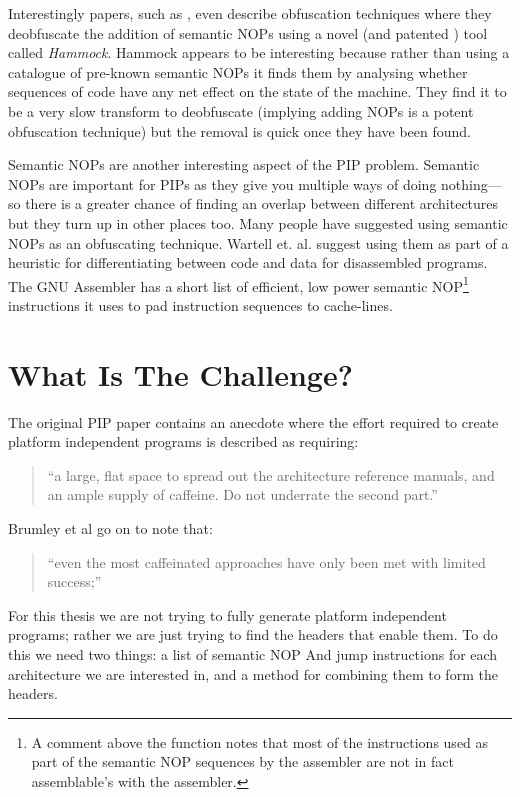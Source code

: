 \documentclass[10pt,]{book}
\begin{document}
Interestingly papers, such as
\autocite{Christodorescu:2005vh}\autocite{Christodorescu:2005vf}, even
describe obfuscation techniques where they deobfuscate the addition of
semantic NOPs using a novel (and patented
\autocite{Christodorescu:2009wo}) tool called \emph{Hammock}. Hammock
appears to be interesting because rather than using a catalogue of
pre-known semantic NOPs it finds them by analysing whether sequences of
code have any net effect on the state of the machine. They find it to be
a very slow transform to deobfuscate (implying adding NOPs is a potent
obfuscation technique) but the removal is quick once they have been
found.

Semantic NOPs are another interesting aspect of the PIP problem.
Semantic NOPs are important for PIPs as they give you multiple ways of
doing nothing---so there is a greater chance of finding an overlap
between different architectures but they turn up in other places too.
Many people
\autocite{Christodorescu:2005vh}\autocite{Owens:2011um}\autocite{Bruschi:2007dn}
have suggested using semantic NOPs as an obfuscating technique. Wartell
et. al.\autocite{Wartell:2011ji} suggest using them as part of a
heuristic for differentiating between code and data for disassembled
programs. The GNU Assembler has a short list of efficient, low power
semantic NOP\footnote{A comment above the
  function\autocite{Anonymous:td} notes that most of the instructions
  used as part of the semantic NOP sequences by the assembler are not in
  fact assemblable's with the assembler.} instructions it uses to pad
instruction sequences to cache-lines\autocite{Anonymous:td}.

\section{What Is The Challenge?}

The original PIP paper\autocite{Cha:2010uh} contains an anecdote where
the effort required to create platform independent programs is described
as requiring:

\begin{quote}
``a large, flat space to spread out the architecture reference manuals,
and an ample supply of caffeine. Do not underrate the second part.''

\end{quote}
Brumley et al go on to note that:

\begin{quote}
``even the most caffeinated approaches have only been met with limited
success;''

\end{quote}
For this thesis we are not trying to fully generate platform independent
programs; rather we are just trying to find the headers that enable
them. To do this we need two things: a list of semantic NOP And jump
instructions for each architecture we are interested in, and a method
for combining them to form the headers.
\end{document}
